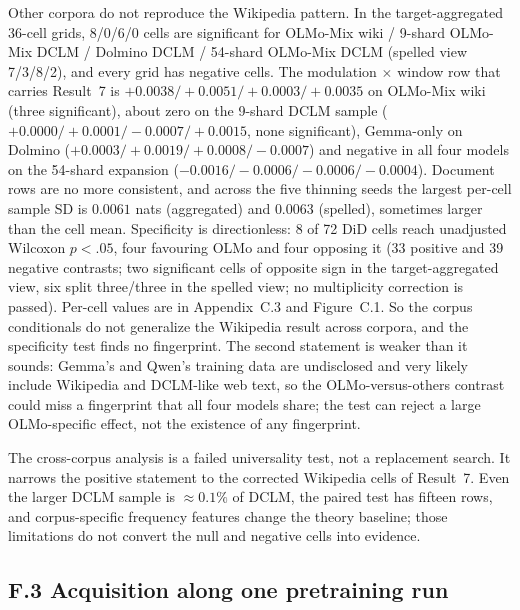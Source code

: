 \documentclass[11pt]{article}
\begin{document}
\begin{resultbox}
Other corpora do not reproduce the Wikipedia pattern. In the target-aggregated 36-cell grids, 8/0/6/0 cells are significant for OLMo-Mix wiki / 9-shard OLMo-Mix DCLM / Dolmino DCLM / 54-shard OLMo-Mix DCLM (spelled view 7/3/8/2), and every grid has negative cells. The modulation $\times$ window row that carries Result~7 is $+0.0038/{+}0.0051/{+}0.0003/{+}0.0035$ on OLMo-Mix wiki (three significant), about zero on the 9-shard DCLM sample ($+0.0000/{+}0.0001/{-}0.0007/{+}0.0015$, none significant), Gemma-only on Dolmino ($+0.0003/{+}0.0019/{+}0.0008/{-}0.0007$) and negative in all four models on the 54-shard expansion ($-0.0016/{-}0.0006/{-}0.0006/{-}0.0004$). Document rows are no more consistent, and across the five thinning seeds the largest per-cell sample SD is $0.0061$ nats (aggregated) and $0.0063$ (spelled), sometimes larger than the cell mean. Specificity is directionless: 8 of 72 DiD cells reach unadjusted Wilcoxon $p<.05$, four favouring OLMo and four opposing it (33 positive and 39 negative contrasts; two significant cells of opposite sign in the target-aggregated view, six split three/three in the spelled view; no multiplicity correction is passed). Per-cell values are in Appendix~C.3 and Figure~C.1. So the corpus conditionals do not generalize the Wikipedia result across corpora, and the specificity test finds no fingerprint. The second statement is weaker than it sounds: Gemma's and Qwen's training data are undisclosed and very likely include Wikipedia and DCLM-like web text, so the OLMo-versus-others contrast could miss a fingerprint that all four models share; the test can reject a large OLMo-specific effect, not the existence of any fingerprint.
\end{resultbox}

The cross-corpus analysis is a failed universality test, not a replacement search. It narrows the positive statement to the corrected Wikipedia cells of Result~7. Even the larger DCLM sample is $\approx0.1\%$ of DCLM, the paired test has fifteen rows, and corpus-specific frequency features change the theory baseline; those limitations do not convert the null and negative cells into evidence.

\subsection*{F.3 Acquisition along one pretraining run}
\end{document}
